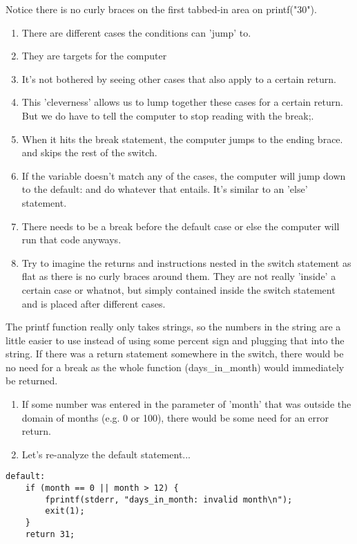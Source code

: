\documentclass[12pt]{article}
\theoremstyle{definition}
\begin{document}
\note Notice there is no curly braces on the first tabbed-in area on printf("30").
\begin{enumerate}
    \item There are different cases the conditions can 'jump' to. 
    \item They are targets for the computer
    \item It's not bothered by seeing other cases that also apply to a certain return. 
    \item This 'cleverness' allows us to lump together these cases for a certain return. But we do have to tell the computer to stop reading with the break;. 
    \item When it hits the break statement, the computer jumps to the ending brace. and skips the rest of the switch.
    \item If the variable doesn't match any of the cases, the computer will jump down to the default: and do whatever that entails. It's similar to an 'else' statement. 
    \item There needs to be a break before the default case or else the computer will run that code anyways. 
    \item Try to imagine the returns and instructions nested in the switch statement as flat as there is no curly braces around them. They are not really 'inside' a certain case or whatnot, but simply contained inside the switch statement and is placed after different cases. 
\end{enumerate}
\note The printf function really only takes strings, so the numbers in the string are a little easier to use instead of using some percent sign and plugging that into the string. 
\note If there was a return statement somewhere in the switch, there would be no need for a break as the whole function (days\_in\_month) would immediately be returned. 

\begin{enumerate}
    \item If some number was entered in the parameter of 'month' that was outside the domain of months (e.g. 0 or 100), there would be some need for an error return. 
    \item Let's re-analyze the default statement...
\end{enumerate}

\begin{lstlisting}
default: 
    if (month == 0 || month > 12) {
        fprintf(stderr, "days_in_month: invalid month\n");
        exit(1);
    }
    return 31;
\end{lstlisting}
\end{document}
